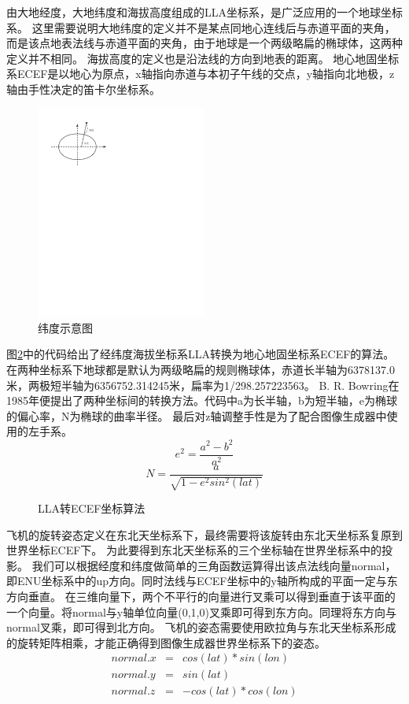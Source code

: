 \par
由大地经度，大地纬度和海拔高度组成的LLA坐标系，是广泛应用的一个地球坐标系。
这里需要说明大地纬度的定义并不是某点同地心连线后与赤道平面的夹角，而是该点地表法线与赤道平面的夹角，由于地球是一个两级略扁的椭球体，这两种定义并不相同。
海拔高度的定义也是沿法线的方向到地表的距离。
地心地固坐标系ECEF是以地心为原点，x轴指向赤道与本初子午线的交点，y轴指向北地极，z轴由手性决定的笛卡尔坐标系。
\begin{figure}[h!]
    \begin{center}
        \includegraphics[width=0.5\textwidth]{pictures/latitude.pdf}
        \caption{纬度示意图}
        \label{latitude}
    \end{center}
\end{figure}
\par
图\ref{LLA2ECEF}中的代码给出了经纬度海拔坐标系LLA转换为地心地固坐标系ECEF的算法。
在两种坐标系下地球都是默认为两级略扁的规则椭球体，赤道长半轴为6378137.0米，两极短半轴为6356752.314245米，扁率为1/298.257223563。
B. R. Bowring在1985年便提出了两种坐标间的转换方法\cite{cha4}。代码中a为长半轴，b为短半轴，e为椭球的偏心率，N为椭球的曲率半径。
最后对z轴调整手性是为了配合图像生成器中使用的左手系。
$$e^2=\frac{a^2-b^2}{a^2}$$
$$N=\frac{a}{\sqrt{1-e^2sin^2(lat)}}$$
\begin{figure}[h!]
    \begin{center}
        
        \caption{LLA转ECEF坐标算法}
        \label{LLA2ECEF}
    \end{center}
\end{figure}
\par
飞机的旋转姿态定义在东北天坐标系下，最终需要将该旋转由东北天坐标系复原到世界坐标ECEF下。
为此要得到东北天坐标系的三个坐标轴在世界坐标系中的投影。
我们可以根据经度和纬度做简单的三角函数运算得出该点法线向量normal，即ENU坐标系中的up方向。同时法线与ECEF坐标中的y轴所构成的平面一定与东方向垂直。
在三维向量下，两个不平行的向量进行叉乘可以得到垂直于该平面的一个向量。将normal与y轴单位向量(0,1,0)叉乘即可得到东方向。同理将东方向与normal叉乘，即可得到北方向。
飞机的姿态需要使用欧拉角与东北天坐标系形成的旋转矩阵相乘，才能正确得到图像生成器世界坐标系下的姿态。
\begin{eqnarray}    \label{eq}
    normal.x&=&cos(lat) * sin(lon)  \nonumber    \\
    normal.y&=&sin(lat) \nonumber    \\
    normal.z&=&-cos(lat) * cos(lon) \nonumber
\end{eqnarray}
